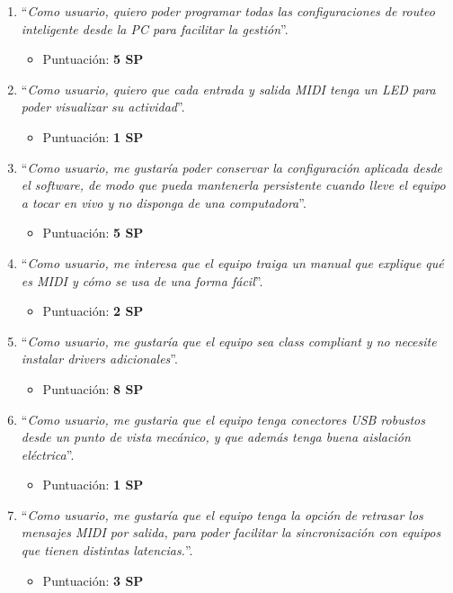 \documentclass[
11pt, %
]{charter}
\begin{document}
\begin{enumerate}
	\item ``\emph{Como usuario, quiero poder programar todas las configuraciones de routeo inteligente desde la PC para facilitar la gestión}''.
	\begin{itemize}
		\item Puntuación: \textbf{5 SP}
	\end{itemize}
	\item ``\emph{Como usuario, quiero que cada entrada y salida MIDI tenga un LED para poder visualizar su actividad}''.
		\begin{itemize}
		\item Puntuación: \textbf{1 SP}
	\end{itemize}
	\item ``\emph{Como usuario, me gustaría poder conservar la configuración aplicada desde el software, de modo que pueda mantenerla persistente cuando lleve el equipo a tocar en vivo y no disponga de una computadora}''.
	\begin{itemize}
		\item Puntuación: \textbf{5 SP}
	\end{itemize}
	
	\item ``\emph{Como usuario, me interesa que el equipo traiga un manual que explique qué es MIDI y cómo se usa de una forma fácil}''.
	\begin{itemize}
		\item Puntuación: \textbf{2 SP}
	\end{itemize}
	\item ``\emph{Como usuario, me gustaría que el equipo sea class compliant y no necesite instalar drivers adicionales}''.
	\begin{itemize}
		\item Puntuación: \textbf{8 SP}
	\end{itemize}
	\item ``\emph{Como usuario, me gustaria que el equipo tenga conectores USB robustos desde un punto de vista mecánico, y que además tenga buena aislación eléctrica}''.
	\begin{itemize}
		\item Puntuación: \textbf{1 SP}
	\end{itemize}
	\item ``\emph{Como usuario, me gustaría que el equipo tenga la opción de retrasar los mensajes MIDI por salida, para poder facilitar la sincronización con equipos que tienen distintas latencias.}''.
	\begin{itemize}
		\item Puntuación: \textbf{3 SP}
	\end{itemize}
\end{enumerate}
\end{document}
